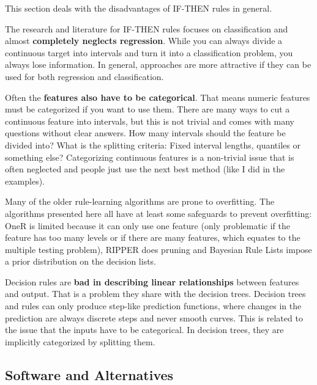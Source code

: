 \documentclass[
  10pt,
]{scrbook}
\begin{document}
This section deals with the disadvantages of IF-THEN rules in general.

The research and literature for IF-THEN rules focuses on classification and almost \textbf{completely neglects regression}.
While you can always divide a continuous target into intervals and turn it into a classification problem, you always lose information.
In general, approaches are more attractive if they can be used for both regression and classification.

Often the \textbf{features also have to be categorical}.
That means numeric features must be categorized if you want to use them.
There are many ways to cut a continuous feature into intervals, but this is not trivial and comes with many questions without clear answers.
How many intervals should the feature be divided into?
What is the splitting criteria: Fixed interval lengths, quantiles or something else?
Categorizing continuous features is a non-trivial issue that is often neglected and people just use the next best method (like I did in the examples).

Many of the older rule-learning algorithms are prone to overfitting.
The algorithms presented here all have at least some safeguards to prevent overfitting:
OneR is limited because it can only use one feature (only problematic if the feature has too many levels or if there are many features, which equates to the multiple testing problem), RIPPER does pruning and Bayesian Rule Lists impose a prior distribution on the decision lists.

Decision rules are \textbf{bad in describing linear relationships} between features and output.
That is a problem they share with the decision trees.
Decision trees and rules can only produce step-like prediction functions, where changes in the prediction are always discrete steps and never smooth curves.
This is related to the issue that the inputs have to be categorical.
In decision trees, they are implicitly categorized by splitting them.

\hypertarget{software-and-alternatives}{%
\subsection{Software and Alternatives}\label{software-and-alternatives}}
\end{document}
